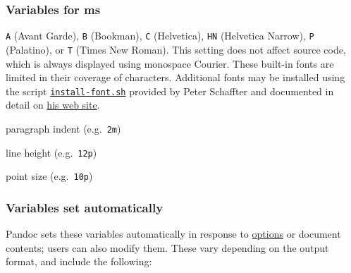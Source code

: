 \documentclass[
  a4paper,
]{article}
\providecommand{\tightlist}{%
  \setlength{\itemsep}{0pt}\setlength{\parskip}{0pt}}
\begin{document}
\hypertarget{variables-for-ms}{%
\subsubsection{Variables for ms}\label{variables-for-ms}}

\begin{description}
\tightlist
\item[\texttt{fontfamily}]
\texttt{A} (Avant Garde), \texttt{B} (Bookman), \texttt{C} (Helvetica),
\texttt{HN} (Helvetica Narrow), \texttt{P} (Palatino), or \texttt{T}
(Times New Roman). This setting does not affect source code, which is
always displayed using monospace Courier. These built-in fonts are
limited in their coverage of characters. Additional fonts may be
installed using the script
\href{https://www.schaffter.ca/mom/bin/install-font.sh}{\texttt{install-font.sh}}
provided by Peter Schaffter and documented in detail on
\href{https://www.schaffter.ca/mom/momdoc/appendices.html\#steps}{his
web site}.
\item[\texttt{indent}]
paragraph indent (e.g.~\texttt{2m})
\item[\texttt{lineheight}]
line height (e.g.~\texttt{12p})
\item[\texttt{pointsize}]
point size (e.g.~\texttt{10p})
\end{description}

\hypertarget{variables-set-automatically}{%
\subsubsection{Variables set
automatically}\label{variables-set-automatically}}

Pandoc sets these variables automatically in response to
\protect\hyperlink{options}{options} or document contents; users can
also modify them. These vary depending on the output format, and include
the following:
\end{document}
